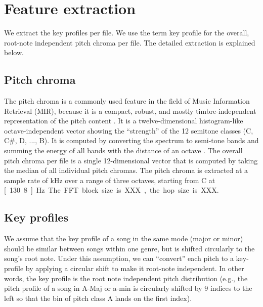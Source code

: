 \documentclass{article}
\begin{document}
\section{Feature extraction}\label{sec:pitch_chroma}
We extract the key profiles per file. We use the term key profile for the overall, root-note independent pitch chroma per file. The detailed extraction is explained below.

\subsection{Pitch chroma}\label{subsec:pc_extract}
The pitch chroma is a commonly used feature in the field of Music Information Retrieval (MIR), because it is a compact, robust, and mostly timbre-independent representation of the pitch content  \cite{muller_information_2007}. It is a twelve-dimensional histogram-like octave-independent vector showing the ``strength'' of the 12 semitone classes (C, C\#, D, ..., B). It is computed by converting the spectrum to semi-tone bands and summing the energy of all bands with the distance of an octave \cite{fujishima_realtime_1999}. 
The overall pitch chroma per file is a single 12-dimensional vector that is computed by taking the median of all individual pitch chromas. 
The pitch chroma is extracted at a sample rate of \unit[10]{kHz} over a range of three octaves, starting from C at \unit[130.8]{Hz}. The FFT block size is XXX, the hop size is XXX.



\subsection{Key profiles}\label{sec:featureset}
We assume that the key profile of a song in the same mode (major or minor) should be similar between songs within one genre, but is shifted circularly to the song's root note. Under this assumption, we can ``convert'' each pitch to a key-profile by applying a circular shift to make it root-note independent. In other words, the key profile is the root note independent pitch distribution (e.g., the pitch profile of a song in A-Maj or a-min is circularly shifted by $9$ indices to the left so that the bin of pitch class A lands on the first index).
\end{document}
